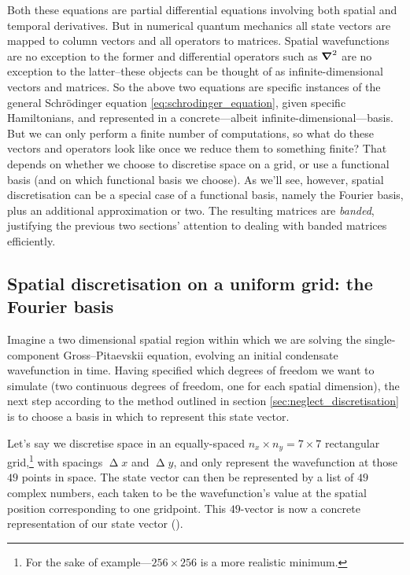 Both these equations are partial differential equations involving both spatial and temporal derivatives. But in numerical quantum mechanics all state vectors are mapped to column vectors and all operators to matrices. Spatial wavefunctions are no exception to the former and differential operators such as $\grad^2$ are no exception to the latter--these objects can be thought of as infinite-dimensional vectors and matrices. So the above two equations are specific instances of the general Schr\"odinger equation \eqref{eq:schrodinger_equation}, given specific Hamiltonians, and represented in a concrete---albeit infinite-dimensional---basis. But we can only perform a finite number of computations, so what do these vectors and operators look like once we reduce them to something finite? That depends on whether we choose to discretise space on a grid, or use a functional basis (and on which functional basis we choose). As we'll see, however, spatial discretisation can be a special case of a functional basis, namely the Fourier basis, plus an additional approximation or two. The resulting matrices are \emph{banded}, justifying the previous two sections' attention to dealing with banded matrices efficiently.

\subsection{Spatial discretisation on a uniform grid: the Fourier basis}

Imagine a two dimensional spatial region within which we are solving the single-component Gross--Pitaevskii equation, evolving an initial condensate wavefunction in time. Having specified which degrees of freedom we want to simulate (two continuous degrees of freedom, one for each spatial dimension), the next step according to the method outlined in section \ref{sec:neglect_discretisation} is to choose a basis in which to represent this state vector.

Let's say we discretise space in an equally-spaced $n_x\times n_y = 7\times 7$ rectangular grid,\footnote{For the sake of example---$256\times256$ is a more realistic minimum.} with spacings $\upDelta x$ and $\upDelta y$, and only represent the wavefunction at those $49$ points in space. The state vector can then be represented by a list of $49$ complex numbers, each taken to be the wavefunction's value at the spatial position corresponding to one gridpoint. This $49$-vector is now a concrete representation of our state vector ().

